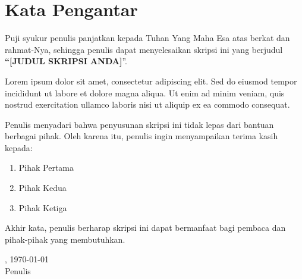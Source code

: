 \section*{Kata Pengantar}
\thispagestyle{plain}

\justify
Puji syukur penulis panjatkan kepada Tuhan Yang Maha Esa atas berkat dan rahmat-Nya, sehingga penulis dapat menyelesaikan skripsi ini yang berjudul \textbf{“[JUDUL SKRIPSI ANDA]}”.

Lorem ipsum dolor sit amet, consectetur adipiscing elit. Sed do eiusmod tempor incididunt ut labore et dolore magna aliqua. Ut enim ad minim veniam, quis nostrud exercitation ullamco laboris nisi ut aliquip ex ea commodo consequat.

Penulis menyadari bahwa penyusunan skripsi ini tidak lepas dari bantuan berbagai pihak. Oleh karena itu, penulis ingin menyampaikan terima kasih kepada:
\begin{enumerate}
    \item Pihak Pertama
    \item Pihak Kedua
    \item Pihak Ketiga
\end{enumerate}

Akhir kata, penulis berharap skripsi ini dapat bermanfaat bagi pembaca dan pihak-pihak yang membutuhkan.

\vspace{1cm}

\begin{flushright}
	[Lokasi], \today\\[1.5cm]
	Penulis
\end{flushright}
